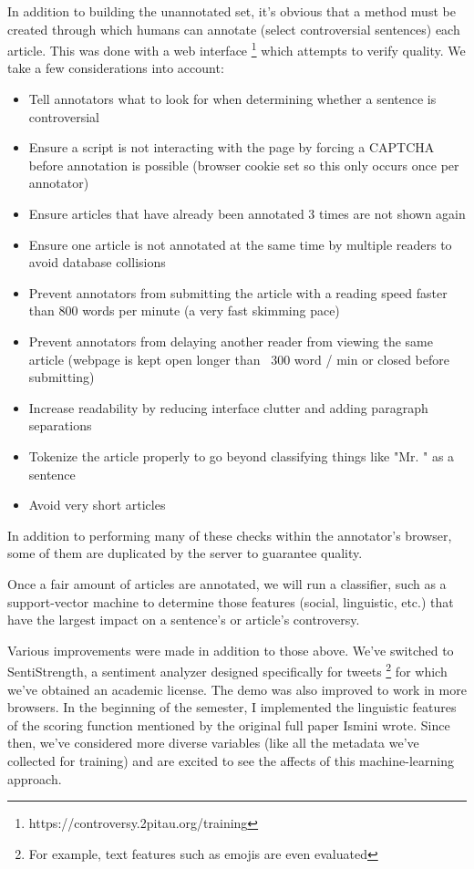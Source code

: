 \documentclass{article}[12pt]
\begin{document}
In addition to building the unannotated set, it's obvious that a method must be created through which humans can annotate (select controversial sentences) each article. This was done with a web interface \footnote{https://controversy.2pitau.org/training} which attempts to verify quality. We take a few considerations into account:

\begin{itemize}
\item Tell annotators what to look for when determining whether a sentence is controversial
\item Ensure a script is not interacting with the page by forcing a CAPTCHA before annotation is possible (browser cookie set so this only occurs once per annotator)
\item Ensure articles that have already been annotated 3 times are not shown again
\item Ensure one article is not annotated at the same time by multiple readers to avoid database collisions
\item Prevent annotators from submitting the article with a reading speed faster than 800 words per minute (a very fast skimming pace)
\item Prevent annotators from delaying another reader from viewing the same article (webpage is kept open longer than ~300 word / min or closed before submitting)
\item Increase readability by reducing interface clutter and adding paragraph separations
\item Tokenize the article properly to go beyond classifying things like "Mr. " as a sentence
\item Avoid very short articles
\end{itemize}

In addition to performing many of these checks within the annotator's browser, some of them are duplicated by the server to guarantee quality.

Once a fair amount of articles are annotated, we will run a classifier, such as a support-vector machine to determine those features (social, linguistic, etc.) that have the largest impact on a sentence's or article's controversy.

Various improvements were made in addition to those above. We've switched to SentiStrength, a sentiment analyzer designed specifically for tweets \footnote{For example, text features such as emojis are even evaluated} for which we've obtained an academic license. The demo was also improved to work in more browsers. In the beginning of the semester, I implemented the linguistic features of the scoring function mentioned by the original full paper Ismini wrote. Since then, we've considered more diverse variables (like all the metadata we've collected for training) and are excited to see the affects of this machine-learning approach.
\end{document}
